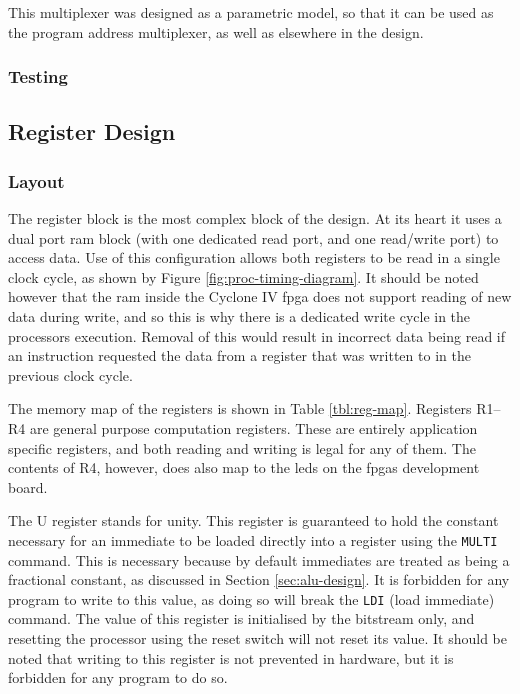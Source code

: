 This multiplexer was designed as a parametric model, so that it can be used as the program address multiplexer, as well as elsewhere in the design.


\subsubsection{Testing}


\subsection{Register Design}
\subsubsection{Layout}

The register block is the most complex block of the design. At its heart it uses a dual port \gls{ram} block (with one dedicated read port, and one read/write port) to access data. Use of this configuration allows both registers to be read in a single clock cycle, as shown by Figure \ref{fig:proc-timing-diagram}. It should be noted however that the \gls{ram} inside the Cyclone IV \gls{fpga} does not support reading of new data during write, and so this is why there is a dedicated write cycle in the processors execution. Removal of this would result in incorrect data being read if an instruction requested the data from a register that was written to in the previous clock cycle.

The memory map of the registers is shown in Table \ref{tbl:reg-map}. Registers R1--R4 are general purpose computation registers. These are entirely application specific registers, and both reading and writing is legal for any of them. The contents of R4, however, does also map to the \glspl{led} on the \glspl{fpga} development board.

The U register stands for unity. This register is guaranteed to hold the constant necessary for an immediate to be loaded directly into a register using the \texttt{MULTI} command. This is necessary because by default immediates are treated as being a fractional constant, as discussed in Section \ref{sec:alu-design}. It is forbidden for any program to write to this value, as doing so will break the \texttt{LDI} (load immediate) command. The value of this register is initialised by the bitstream only, and resetting the processor using the reset switch will not reset its value. It should be noted that writing to this register is not prevented in hardware, but it is forbidden for any program to do so.


